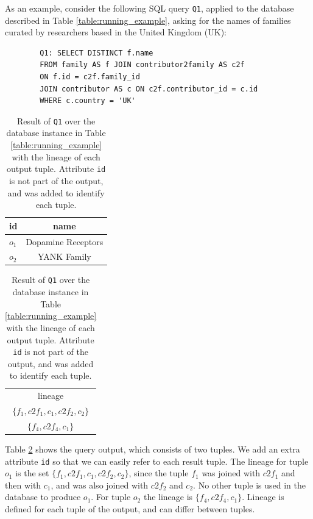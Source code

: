 \documentclass[preprint,12pt,sort&compress]{elsarticle}
\begin{document}
As an example, consider the following SQL query \texttt{Q1}, applied to the database described in Table \ref{table:running_example}, asking for the names of families curated by researchers based in the United Kingdom (UK):

\vspace{2mm}
{\footnotesize
\begin{adjustwidth}{25pt}{0pt}
\begin{verbatim}
		Q1: SELECT DISTINCT f.name
		FROM family AS f JOIN contributor2family AS c2f 
		ON f.id = c2f.family_id
		JOIN contributor AS c ON c2f.contributor_id = c.id
		WHERE c.country = 'UK'
\end{verbatim}	
\end{adjustwidth}
}
\vspace{2mm}

\begin{table}[hbt]
\centering
  \begin{tabular}{|l||c|}
  \hline
    id & name\\
    \hline
    $o_1$ &  Dopamine Receptors\\
    $o_2$ & YANK Family\\
    \hline
  \end{tabular}
  \begin{tabular}{c}
  	lineage   \\
  	$\{f_1, c2f_1, c_1, c2f_2, c_2\}$ \\
  	$\{ f_4, c2f_4, c_1\}$ \\
  \end{tabular}
    \caption{Result of \texttt{Q1} over the database instance in Table \ref{table:running_example} with the lineage of each output tuple. %
    Attribute \texttt{id} is not part of the output, and was added to identify each tuple.}
  \label{table:result}
\end{table}

Table \ref{table:result} shows the query output, which consists of two tuples. We add an extra  attribute \texttt{id} so that we can easily refer to each result tuple.  
The lineage for tuple $o_1$ is the set $\{f_1, c2f_1, c_1, c2f_2, c_2\}$, since the tuple $f_1$ was joined with $c2f_1$ and then with $c_1$, and was also joined with $c2f_2$ and $c_2$. No other tuple is used in the database to produce $o_1$.
For tuple $o_2$ the lineage is $\{ f_4, c2f_4, c_1\}$.
Lineage is defined for each tuple of the output, and can differ between tuples.
\end{document}

